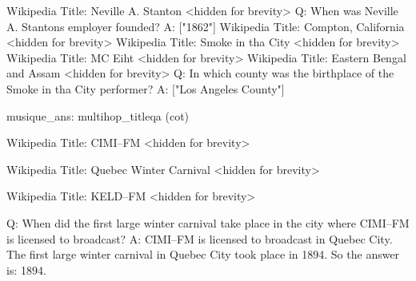 \documentclass[
]{article}
\newenvironment{Shaded}{}{}
\newcommand{\NormalTok}[1]{#1}
\begin{document}
\begin{Shaded}
\begin{Highlighting}[]
\NormalTok{Wikipedia Title: Neville A. Stanton}
\NormalTok{\textless{}hidden for brevity\textgreater{}}
\NormalTok{Q: When was Neville A. Stanton\textquotesingle{}s employer founded?}
\NormalTok{A: ["1862"]}
\NormalTok{Wikipedia Title: Compton, California}
\NormalTok{\textless{}hidden for brevity\textgreater{}}
\NormalTok{Wikipedia Title: Smoke in tha City}
\NormalTok{\textless{}hidden for brevity\textgreater{}}
\NormalTok{Wikipedia Title: MC Eiht}
\NormalTok{\textless{}hidden for brevity\textgreater{}}
\NormalTok{Wikipedia Title: Eastern Bengal and Assam}
\NormalTok{\textless{}hidden for brevity\textgreater{}}
\NormalTok{Q: In which county was the birthplace of the Smoke in tha City performer?}
\NormalTok{A: ["Los Angeles County"] }
\end{Highlighting}
\end{Shaded}

\begin{Shaded}
\begin{Highlighting}[]
\NormalTok{musique\_ans: multihop\_titleqa (cot) }
\end{Highlighting}
\end{Shaded}

\begin{Shaded}
\begin{Highlighting}[]
\NormalTok{Wikipedia Title: CIMI–FM}
\NormalTok{\textless{}hidden for brevity\textgreater{} }
\end{Highlighting}
\end{Shaded}

\begin{Shaded}
\begin{Highlighting}[]
\NormalTok{Wikipedia Title: Quebec Winter Carnival}
\NormalTok{\textless{}hidden for brevity\textgreater{} }
\end{Highlighting}
\end{Shaded}

\begin{Shaded}
\begin{Highlighting}[]
\NormalTok{Wikipedia Title: KELD–FM}
\NormalTok{\textless{}hidden for brevity\textgreater{} }
\end{Highlighting}
\end{Shaded}

\begin{Shaded}
\begin{Highlighting}[]
\NormalTok{Q: When did the first large winter carnival take place in the city where CIMI–FM is licensed to broadcast?}
\NormalTok{A: CIMI–FM is licensed to broadcast in Quebec City. The first large winter carnival in Quebec City took place in 1894. So the answer is: 1894. }
\end{Highlighting}
\end{Shaded}
\end{document}
